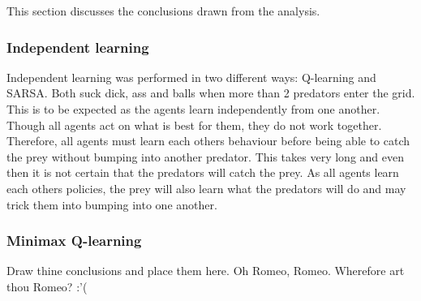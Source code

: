 This section discusses the conclusions drawn from the analysis. %

\subsubsection{Independent learning}
Independent learning was performed in two different ways: Q-learning and SARSA. Both suck dick, ass and balls when more than 2 predators enter the grid. This is to be expected as the agents learn independently from one another. Though all agents act on what is best for them, they do not work together. Therefore, all agents must learn each others behaviour before being able to catch the prey without bumping into another predator. This takes very long and even then it is not certain that the predators will catch the prey. As all agents learn each others policies, the prey will also learn what the predators will do and may trick them into bumping into one another.

\subsubsection{Minimax Q-learning}
Draw thine conclusions and place them here. Oh Romeo, Romeo. Wherefore art thou Romeo? :'(